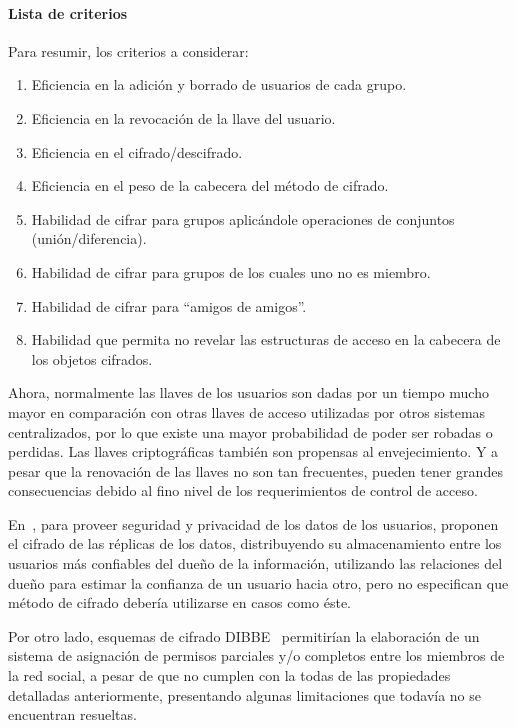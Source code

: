     \paragraph{Lista de criterios}
    Para resumir, los criterios a considerar:
    \begin{enumerate}
        \item Eficiencia en la adición y borrado de usuarios de cada grupo.
        \item Eficiencia en la revocación de la llave del usuario.
        \item Eficiencia en el cifrado/descifrado.
        \item Eficiencia en el peso de la cabecera del método de cifrado.
        \item Habilidad de cifrar para grupos aplicándole operaciones de conjuntos (unión/diferencia).
        \item Habilidad de cifrar para grupos de los cuales uno no es miembro.
        \item Habilidad de cifrar para ``amigos de amigos''.
        \item Habilidad que permita no revelar las estructuras de acceso en la cabecera de los objetos cifrados.
    \end{enumerate}

    Ahora, normalmente las llaves de los usuarios son dadas por un tiempo mucho
    mayor en comparación con otras llaves de acceso utilizadas por otros sistemas
    centralizados, por lo que existe una mayor probabilidad de poder ser robadas o perdidas.
     Las llaves criptográficas también son propensas al envejecimiento. Y a pesar que la
    renovación de las llaves no son tan frecuentes, pueden tener grandes
    consecuencias debido al fino nivel de los requerimientos de control de acceso.
    
     En~\cite{conf:acsac:VuABD09}, para proveer
    seguridad y privacidad de los datos de los usuarios, proponen el cifrado de
    las réplicas de los datos, distribuyendo su almacenamiento entre los usuarios más
    confiables del dueño de la información, utilizando las relaciones del dueño
    para estimar la confianza de un usuario hacia otro, pero no especifican que
    método de cifrado debería utilizarse en casos como éste.
    

    Por otro lado, esquemas de cifrado DIBBE~\cite{Buchegger:Encryption:2011} %
    permitirían la elaboración de un sistema de asignación de permisos
    parciales y/o completos entre los miembros de la red social,
    a pesar de que no cumplen con la todas de las propiedades detalladas anteriormente,
    presentando algunas limitaciones que todavía no se encuentran resueltas.

